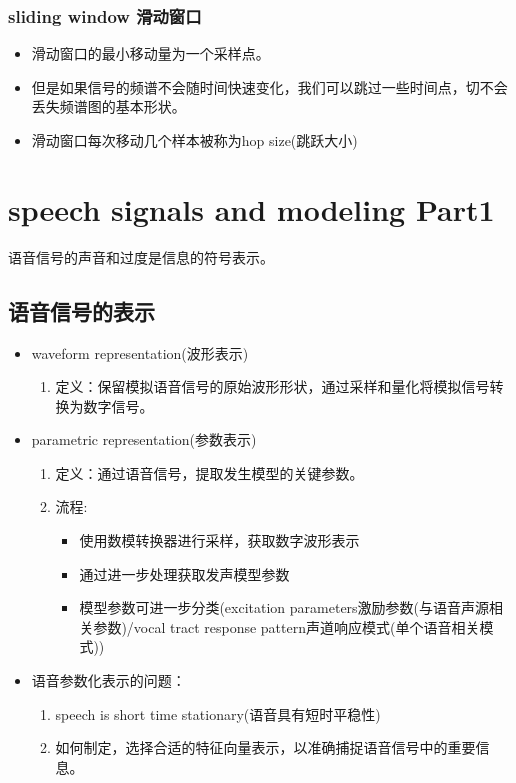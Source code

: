 \documentclass[UTF8]{ctexart}
\begin{document}
\subsubsection{sliding window 滑动窗口}

\begin{itemize}
    \item 滑动窗口的最小移动量为一个采样点。
    \item 但是如果信号的频谱不会随时间快速变化，我们可以跳过一些时间点，切不会丢失频谱图的基本形状。
    \item 滑动窗口每次移动几个样本被称为hop size(跳跃大小)
\end{itemize}

\section{speech signals and modeling Part1}

语音信号的声音和过度是信息的符号表示。

\subsection{语音信号的表示}
\begin{itemize}
    \item waveform representation(波形表示)
    \begin{enumerate}
        \item 定义：保留模拟语音信号的原始波形形状，通过采样和量化将模拟信号转换为数字信号。
    \end{enumerate}
    \item parametric representation(参数表示)
    \begin{enumerate}
        \item 定义：通过语音信号，提取发生模型的关键参数。
        \item 流程:
        \begin{itemize}
            \item 使用数模转换器进行采样，获取数字波形表示
            \item 通过进一步处理获取发声模型参数
            \item 模型参数可进一步分类(excitation parameters激励参数(与语音声源相关参数)/vocal tract response pattern声道响应模式(单个语音相关模式))
        \end{itemize}
    \end{enumerate}
    \item 语音参数化表示的问题：
    \begin{enumerate}
        \item speech is short time stationary(语音具有短时平稳性)
        \item 如何制定，选择合适的特征向量表示，以准确捕捉语音信号中的重要信息。
    \end{enumerate}
\end{itemize}
\end{document}
